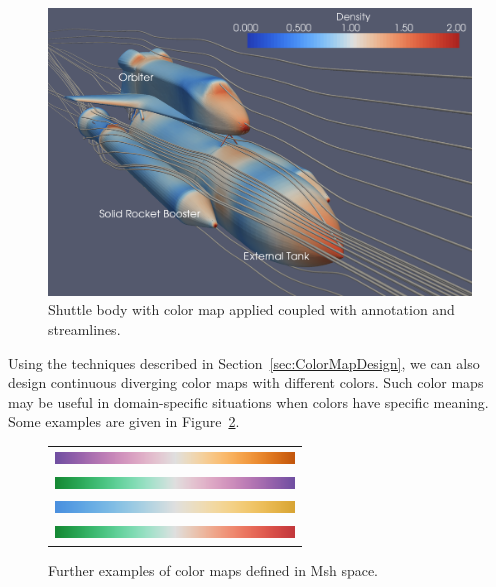 \documentclass{acmsiggraph}               %
\newcommand{\Msh}{Msh\xspace}
\begin{document}
\begin{figure}
  \centering
  \includegraphics[width=\linewidth]{images/ShuttleExample}
  \caption{Shuttle body with color map applied coupled with annotation and
    streamlines.}
  \label{fig:ColorMapOnShuttle}
\end{figure}

Using the techniques described in Section~\ref{sec:ColorMapDesign}, we can
also design continuous diverging color maps with different colors.  Such
color maps may be useful in domain-specific situations when colors have
specific meaning.  Some examples are given in
Figure~\ref{fig:OtherColorMaps}.

\begin{figure}
  \centering
  \begin{tabular}{c}
    \includegraphics[width=2.5in]{images/Purple2OrangeBar} \\
    \includegraphics[width=2.5in]{images/Green2PurpleBar} \\
    \includegraphics[width=2.5in]{images/Blue2TanBar} \\
    \includegraphics[width=2.5in]{images/Green2RedDivBar}
  \end{tabular}
  \caption{Further examples of color maps defined in \Msh space.}
  \label{fig:OtherColorMaps}
\end{figure}
\end{document}
